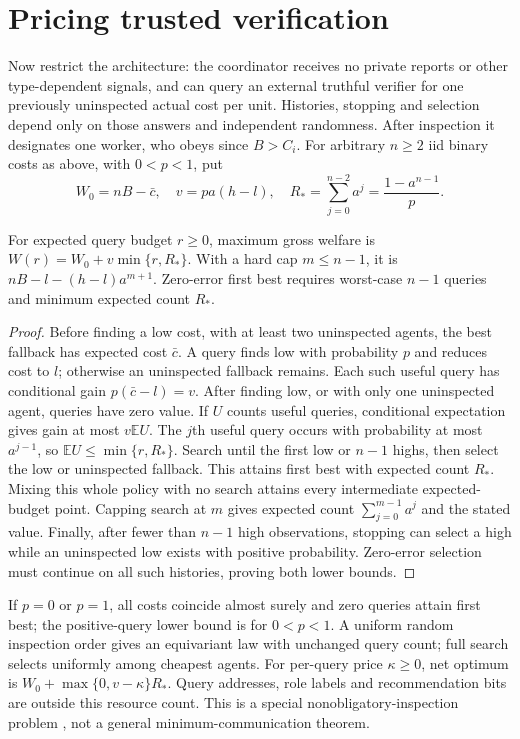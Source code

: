 \section{Pricing trusted verification}\label{sec:07-phase11-2}
Now restrict the architecture: the coordinator receives no private reports or
other type-dependent signals, and can query an external truthful verifier for
one previously uninspected actual cost per unit. Histories, stopping and
selection depend only on those answers and independent randomness. After
inspection it designates one worker, who obeys since $B>C_i$.
For arbitrary $n\ge2$ iid binary costs as above, with $0<p<1$, put
\[
 W_0=nB-\bar c,\quad v=pa(h-l),\quad
 R_*=\sum_{j=0}^{n-2}a^j=\frac{1-a^{n-1}}p.
\]
\begin{proposition}\label{result:07-phase11-2}
For expected query budget $r\ge0$, maximum gross welfare is
$W(r)=W_0+v\min\{r,R_*\}$.
With a hard cap $m\le n-1$, it is $nB-l-(h-l)a^{m+1}$.
Zero-error first best requires worst-case $n-1$ queries and minimum expected
count $R_*$.
\end{proposition}
\begin{proof}
Before finding a low cost, with at least two uninspected agents, the best
fallback has expected cost $\bar c$. A query finds low with probability $p$
and reduces cost to $l$; otherwise an uninspected fallback remains. Each such
useful query has conditional gain $p(\bar c-l)=v$. After finding low, or with
only one uninspected agent, queries have zero value. If $U$ counts useful
queries, conditional expectation gives gain at most $v\mathbb E U$.
The $j$th useful query occurs with probability at most $a^{j-1}$, so
$\mathbb E U\le\min\{r,R_*\}$. Search until the first low or $n-1$ highs,
then select the low or uninspected fallback. This attains first best with
expected count $R_*$. Mixing this whole policy with no search attains every
intermediate expected-budget point. Capping search at $m$ gives expected
count $\sum_{j=0}^{m-1}a^j$ and the stated value. Finally, after fewer than
$n-1$ high observations, stopping can select a high while an uninspected low
exists with positive probability. Zero-error selection must continue on all
such histories, proving both lower bounds.
\end{proof}
If $p=0$ or $p=1$, all costs coincide almost surely and zero queries attain
first best; the positive-query lower bound is for $0<p<1$.
A uniform random inspection order gives an equivariant law with unchanged
query count; full search selects uniformly among cheapest agents.
For per-query price $\kappa\ge0$, net optimum is
$W_0+\max\{0,v-\kappa\}R_*$. Query addresses, role labels and recommendation
bits are outside this resource count. This is a special nonobligatory-inspection
problem \citep{beyhaghi2022}, not a general minimum-communication theorem.

